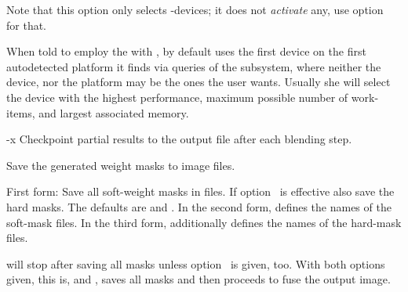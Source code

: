 \begin{codelist}
  Note that this option only selects -devices; it does not \emph{activate} any, use
  option~ for that.

  When told to employ the  with , by default \App{} uses the first
  device on the first autodetected platform it finds via queries of the 
  subsystem, where neither the device, nor the platform may be the ones the user wants.  Usually
  she will select the device with the highest performance, maximum possible number of
  work-items, and largest associated memory.


\ifenblend
    \label{opt:x}%
  \item[-x]
    Checkpoint partial results to the output
    file after each blending step.
\fi


\ifenfuse
    \label{opt:save-masks}%
  \item[\itempar{--save-masks~\textrm{(\oldstylefirst~form)}
      \\ --save-masks=\metavar{SOFT-MASK-TEMPLATE}~\textrm{(\oldstylesecond~form)}
      \\ --save-masks=\metavar{SOFT-MASK-TEMPLATE}:\feasiblebreak
      \metavar{HARD-MASK-TEMPLATE}~\textrm{(\oldstylethird~form)}}]\itemend
    Save the generated weight masks to image
    files.

    \begin{sloppypar}
      First form: Save all soft-weight masks in files.  If option~ is
      effective also save the hard masks.  The defaults are  and
      . In the second form,
       defines the names of the soft-mask files.  In the
      third form,  additionally defines the names of the
      hard-mask files.
    \end{sloppypar}

    \App{} will stop after saving
    all masks unless option~ is given, too.  With both options given, this is,
     and , \App{} saves all masks and then proceeds to
    fuse the output image.


\end{codelist}
